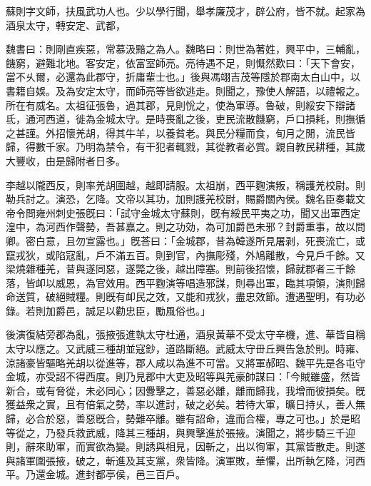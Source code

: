 
\begin{pinyinscope}
蘇則字文師，扶風武功人也。少以學行聞，舉孝廉茂才，辟公府，皆不就。起家為酒泉太守，轉安定、武都，

魏書曰：則剛直疾惡，常慕汲黯之為人。魏略曰：則世為著姓，興平中，三輔亂，饑窮，避難北地。客安定，依富室師亮。亮待遇不足，則慨然歎曰：「天下會安，當不乆爾，必還為此郡守，折庸輩士也。」後與馮翊吉茂等隱於郡南太白山中，以書籍自娛。及為安定太守，而師亮等皆欲逃走。則聞之，豫使人解語，以禮報之。所在有威名。太祖征張魯，過其郡，見則恱之，使為軍導。魯破，則綏安下辯諸氐，通河西道，徙為金城太守。是時喪亂之後，吏民流散饑窮，戶口損耗，則撫循之甚謹。外招懷羌胡，得其牛羊，以養貧老。與民分糧而食，旬月之閒，流民皆歸，得數千家。乃明為禁令，有干犯者輒戮，其從教者必賞。親自教民耕種，其歲大豐收，由是歸附者日多。

李越以隴西反，則率羌胡圍越，越即請服。太祖崩，西平麴演叛，稱護羌校尉。則勒兵討之。演恐，乞降。文帝以其功，加則護羌校尉，賜爵關內侯。魏名臣奏載文帝令問雍州刺史張旣曰：「試守金城太守蘇則，旣有綏民平夷之功，聞又出軍西定湟中，為河西作聲勢，吾甚嘉之。則之功効，為可加爵邑未邪？封爵重事，故以問卿。密白意，且勿宣露也。」旣荅曰：「金城郡，昔為韓遂所見屠剥，死喪流亡，或竄戎狄，或陷寇亂，戶不滿五百。則到官，內撫彫殘，外鳩離散，今見戶千餘。又梁燒雜種羌，昔與遂同惡，遂斃之後，越出障塞。則前後招懷，歸就郡者三千餘落，皆卹以威恩，為官效用。西平麴演等唱造邪謀，則尋出軍，臨其項領，演則歸命送質，破絕賊糧。則旣有卹民之效，又能和戎狄，盡忠效節。遭遇聖明，有功必錄。若則加爵邑，誠足以勸忠臣，勵風俗也。」

後演復結旁郡為亂，張掖張進執太守杜通，酒泉黃華不受太守辛機，進、華皆自稱太守以應之。又武威三種胡並寇鈔，道路斷絕。武威太守毌丘興告急於則。時雍、涼諸豪皆驅略羌胡以從進等，郡人咸以為進不可當。又將軍郝昭、魏平先是各屯守金城，亦受詔不得西度。則乃見郡中大吏及昭等與羌豪帥謀曰：「今賊雖盛，然皆新合，或有脅從，未必同心；因釁擊之，善惡必離，離而歸我，我增而彼損矣。旣獲益衆之實，且有倍氣之勢，率以進討，破之必矣。若待大軍，曠日持乆，善人無歸，必合於惡，善惡旣合，勢難卒離。雖有詔命，違而合權，專之可也。」於是昭等從之，乃發兵救武威，降其三種胡，與興擊進於張掖。演聞之，將步騎三千迎則，辭來助軍，而實欲為變。則誘與相見，因斬之，出以徇軍，其黨皆散走。則遂與諸軍圍張掖，破之，斬進及其支黨，衆皆降。演軍敗，華懼，出所執乞降，河西平。乃還金城。進封都亭侯，邑三百戶。


\end{pinyinscope}
